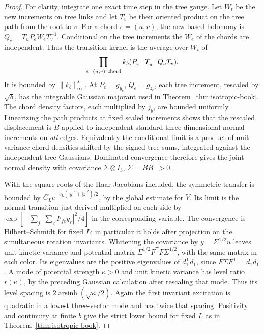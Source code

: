 \begin{proof}
For clarity, integrate one exact time step in the tree gauge. Let \(W_t\)
be the new increments on tree links and let \(T_v\) be their oriented
product on the tree path from the root to \(v\). For a chord \(e=(u,v)\),
the new based holonomy is \(Q_e=T_u P_e W_e T_v^{-1}\). Conditional on
the tree increments the \(W_e\) of the chords are independent. Thus the
transition kernel is the average over \(W_t\) of
\[
 \prod_{e=(u,v)\ {\rm chord}} k_b(P_e^{-1}T_u^{-1}Q_e T_v).
\]
It is bounded by \(\|k_b\|_\infty^s\). At \(P_e=g_{y_e}\),
\(Q_e=g_{z_e}\), each tree increment, rescaled by \(\sqrt b\), has the
integrable Gaussian majorant used in Theorem~\ref{thm:isotropic-book}.
The chord density factors, each multiplied by \(j_b\), are bounded
uniformly. Linearizing the path products at fixed scaled increments shows
that the rescaled displacement is \(B\) applied to independent standard
three-dimensional normal increments on \emph{all} edges. Equivalently the
conditional limit is a product of unit-variance chord densities shifted
by the signed tree sums, integrated against the independent tree Gaussians.
Dominated convergence therefore gives the joint normal density with
covariance \(\Sigma\otimes I_3\), \(\Sigma=BB^{\mathsf T}>0\).

With the square roots of the Haar Jacobians included, the symmetric
transfer is bounded by \(C_L e^{-c_L(|y|^2+|z|^2)/2}\), by the global
estimate for \(V\). Its limit is the normal transition just derived
multiplied on each side by
\(\exp[-\sum_f|\sum_e F_{fe} y_e|^2/4]\) in the corresponding variable.
The convergence is Hilbert--Schmidt for fixed \(L\); in particular it
holds after projection on the simultaneous rotation invariants. Whitening
the covariance by \(y=\Sigma^{1/2}u\) leaves unit kinetic variance and
potential matrix \(\Sigma^{1/2}F^{\mathsf T}F\Sigma^{1/2}\), with the
same matrix in each color. Its eigenvalues are the positive eigenvalues
of \(d_1^{\mathsf T}d_1\), since \(F\Sigma F^{\mathsf T}
=d_1d_1^{\mathsf T}\). A mode of potential strength \(\kappa>0\) and
unit kinetic variance has level ratio \(r(\kappa)\), by the preceding
Gaussian calculation after rescaling that mode. Thus its level spacing is
\(2\operatorname{arsinh}(\sqrt\kappa/2)\). Again the first invariant
excitation is quadratic in a lowest three-vector mode and has twice that
spacing. Positivity and continuity at finite \(b\) give the strict lower
bound for fixed \(L\) as in Theorem~\ref{thm:isotropic-book}.


\end{proof}
